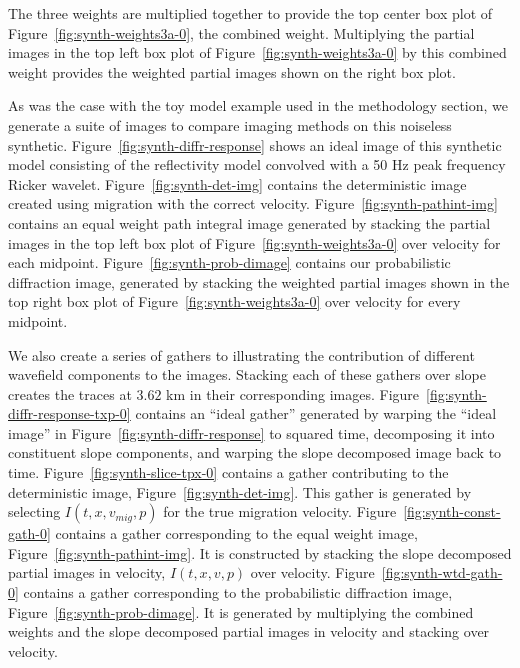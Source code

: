The three weights are multiplied together to provide the top center box plot of Figure~\ref{fig:synth-weights3a-0}, the combined weight.  Multiplying the partial images in the top left box plot of Figure~\ref{fig:synth-weights3a-0} by this combined weight provides the weighted partial images shown on the right box plot.




As was the case with the toy model example used in the methodology section, we generate a suite of images to compare imaging methods on this noiseless synthetic.  Figure~\ref{fig:synth-diffr-response} shows an ideal image of this synthetic model consisting of the reflectivity model convolved with a 50 Hz peak frequency Ricker wavelet.  Figure~\ref{fig:synth-det-img} contains the deterministic image created using migration with the correct velocity. Figure~\ref{fig:synth-pathint-img} contains  an equal weight path integral image generated by stacking the partial images in the top left box plot of Figure~\ref{fig:synth-weights3a-0} over velocity for each midpoint.   Figure~\ref{fig:synth-prob-dimage} contains our probabilistic diffraction image, generated by stacking the weighted partial images shown in the top right box plot of Figure~\ref{fig:synth-weights3a-0} over velocity for every midpoint. 

We also create a series of gathers to illustrating the contribution of different wavefield components to the images.  Stacking each of these gathers over slope creates the traces at $3.62$ km in their corresponding images.  Figure~\ref{fig:synth-diffr-response-txp-0} contains an ``ideal gather'' generated by warping the ``ideal image'' in Figure~\ref{fig:synth-diffr-response} to squared time, decomposing it into constituent slope components, and warping the slope decomposed image back to time. Figure~\ref{fig:synth-slice-tpx-0} contains a gather contributing to the deterministic image, Figure~\ref{fig:synth-det-img}. This gather is generated by selecting $I\left(t,x,v_{mig},p\right)$  for the true migration velocity.  Figure~\ref{fig:synth-const-gath-0} contains a gather corresponding to the equal weight image, Figure~\ref{fig:synth-pathint-img}.  It is constructed by stacking the slope decomposed partial images in velocity, $I\left(t,x,v,p\right)$  over velocity.  Figure~\ref{fig:synth-wtd-gath-0} contains a gather corresponding to the probabilistic diffraction image, Figure~\ref{fig:synth-prob-dimage}.  It is generated by multiplying the combined weights and the slope decomposed partial images in velocity and stacking over velocity.



